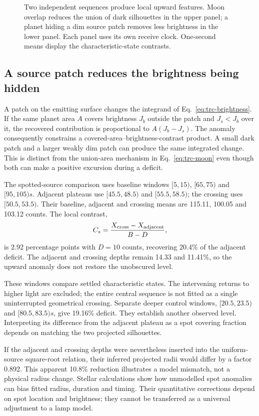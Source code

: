\begin{figure}[t]
\centering
\caption{Two independent sequences produce local upward features. Moon overlap reduces the union of dark silhouettes in the upper panel; a planet hiding a dim source patch removes less brightness in the lower panel. Each panel uses its own receive clock. One-second means display the characteristic-state contrasts.}
\label{fig:trc-brightenings}
\end{figure}

\subsection{A source patch reduces the brightness being hidden}
A patch on the emitting surface changes the integrand of Eq.~\ref{eq:trc-brightness}. If the same planet area $A$ covers brightness $J_b$ outside the patch and $J_s<J_b$ over it, the recovered contribution is proportional to $A(J_b-J_s)$. The anomaly consequently constrains a covered-area--brightness-contrast product. A small dark patch and a larger weakly dim patch can produce the same integrated change. This is distinct from the union-area mechanism in Eq.~\ref{eq:trc-moon} even though both can make a positive excursion during a deficit.

The spotted-source comparison uses baseline windows $[5,15)$, $[65,75)$ and $[95,105)\unit{s}$. Adjacent plateaus use $[45.5,48.5)$ and $[55.5,58.5)$; the crossing uses $[50.5,53.5)$. Their baseline, adjacent and crossing means are 115.11, 100.05 and 103.12 counts. The local contrast,
\begin{equation}
C_s=\frac{X_{\rm cross}-X_{\rm adjacent}}{B-D},
\label{eq:trc-spot}
\end{equation}
is 2.92 percentage points with $D=10$ counts, recovering 20.4\% of the adjacent deficit. The adjacent and crossing depths remain 14.33 and 11.41\%, so the upward anomaly does not restore the unobscured level.

These windows compare settled characteristic states. The intervening returns to higher light are excluded; the entire central sequence is not fitted as a single uninterrupted geometrical crossing. Separate deeper control windows, $[20.5,23.5)$ and $[80.5,83.5)\unit{s}$, give 19.16\% deficit. They establish another observed level. Interpreting its difference from the adjacent plateau as a spot covering fraction depends on matching the two projected silhouettes.

If the adjacent and crossing depths were nevertheless inserted into the uniform-source square-root relation, their inferred projected radii would differ by a factor 0.892. This apparent 10.8\% reduction illustrates a model mismatch, not a physical radius change. Stellar calculations show how unmodelled spot anomalies can bias fitted radius, duration and timing\cite{oshagh2013}. Their quantitative corrections depend on spot location and brightness; they cannot be transferred as a universal adjustment to a lamp model.

